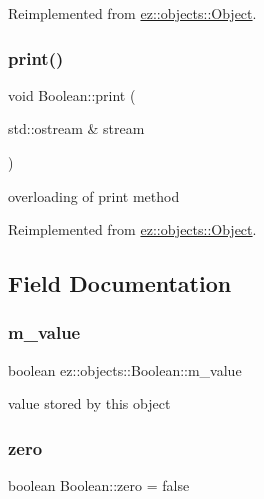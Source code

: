Reimplemented from \hyperlink{classez_1_1objects_1_1Object_a0fdfe18e6c35d6b0d7e7a01265aded15}{ez\+::objects\+::\+Object}.

\mbox{\label{classez_1_1objects_1_1Boolean_aeedca84417b36666eb237d8453b744b6}} 
\subsubsection{\texorpdfstring{print()}{print()}}
{\footnotesize\ttfamily void Boolean\+::print (\begin{DoxyParamCaption}\item[{std\+::ostream \&}]{stream }\end{DoxyParamCaption})\hspace{0.3cm}{\ttfamily [virtual]}}

overloading of print method 

Reimplemented from \hyperlink{classez_1_1objects_1_1Object_a9e20f39a78163f67f000576149d858b3}{ez\+::objects\+::\+Object}.



\subsection{Field Documentation}
\mbox{\label{classez_1_1objects_1_1Boolean_a535d669406c4dae958e2ce00b2a339d3}} 
\subsubsection{\texorpdfstring{m\+\_\+value}{m\_value}}
{\footnotesize\ttfamily boolean ez\+::objects\+::\+Boolean\+::m\+\_\+value}

value stored by this object \mbox{\label{classez_1_1objects_1_1Boolean_aeb78b2275c789e764ceebe3bb7e86945}} 
\subsubsection{\texorpdfstring{zero}{zero}}
{\footnotesize\ttfamily boolean Boolean\+::zero = false\hspace{0.3cm}{\ttfamily [static]}}

